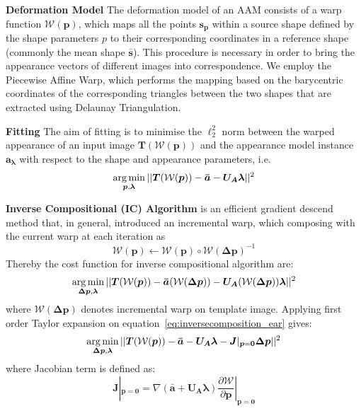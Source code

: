 \noindent\textbf{Deformation Model} The deformation model of an AAM consists of a warp function $\mathcal{W}(\bm{p})$, which maps all the points $\bm{s_p}$ within a source shape defined by the shape parameters $p$ to their corresponding coordinates in a reference shape (commonly the mean shape $\bm{\bar{s}}$). This procedure is necessary in order to bring the appearance vectors of different images into correspondence. We employ the Piecewise Affine Warp, which performs the mapping based on the barycentric coordinates of the corresponding triangles between the two shapes that are extracted using Delaunay Triangulation.

\noindent\textbf{Fitting}
The aim of fitting is to minimise the $\ell_2^2$ norm between the warped appearance of an input image $\bm{T}(\mathcal{W}(\bm{p}))$ and the appearance model instance $\bm{a_\lambda}$ with respect to the shape and appearance parameters, i.e. 
\begin{equation} 
\label{eq:aamfitting_ear}
    \operatorname*{arg\,min}_{\bm{p}, \bm{\lambda}}||\bm{T}(\mathcal{W}(\bm{p}))-\bm{\bar{a}}-\bm{U_A}\bm{\lambda}||^2
\end{equation}



\noindent\textbf{Inverse Compositional (IC) Algorithm} is an efficient gradient descend method that, in general, introduced an incremental warp, which composing with the current warp at each iteration as
\begin{equation}
\label{eq:composition}
\mathcal{W}(\bm{p})\leftarrow\mathcal{W}(\bm{p})\circ\mathcal{W}(\bm{\Delta p})^{-1}
\end{equation}
Thereby the cost function for inverse compositional algorithm are:
\begin{equation}
\label{eq:inversecomposition_ear}
\operatorname*{arg\,min}_{\bm{\Delta p}, \bm{\lambda}}||\bm{T}(\mathcal{W}(\bm{p}))-\bm{\bar{a}}(\mathcal{W}(\bm{\Delta p}))-\bm{U_A}(\mathcal{W}(\bm{\Delta p}))\bm{\lambda}||^2
\end{equation}
where $\mathcal{W}(\bm{\Delta p})$ denotes incremental warp on template image. 
Applying first order Taylor expansion on equation~\ref{eq:inversecomposition_ear} gives:
\begin{equation}
\label{eq:forwardcompositiontaylor-ear}
\operatorname*{arg\,min}_{\bm{\Delta p}, \bm{\lambda}}||\bm{T}(\mathcal{W}(\bm{p}))-\bm{\bar{a}}-\bm{U_A}\bm{\lambda}-\bm{J}|_{\bm{p}=\bm{0}}\bm{\Delta p}||^2
\end{equation}
where Jacobian term is defined as:
\begin{equation}
\label{eq:jacobian}
\bm{J}|_{\bm{p}=\bm{0}}=\nabla(\bm{\bar{a}}+\bm{U_A}\bm{\lambda})\frac{\partial \mathcal{W}}{\partial \bm{p}}|_{\bm{p}=\bm{0}}
\end{equation}

